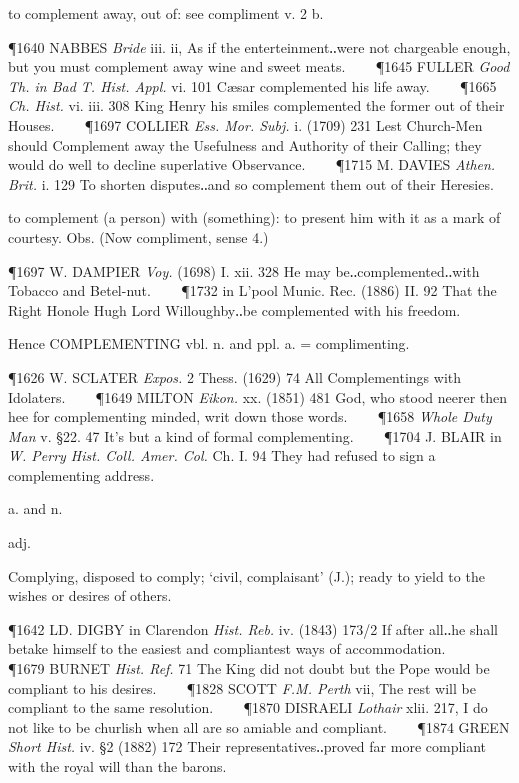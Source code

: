 \begin{description}[wide, labelwidth=!, labelindent=0pt]
\begin{myenumerate}
 to complement away, out of: see compliment v. 2 b.

\P 1640 NABBES  \textit{Bride} iii. ii, As if the enterteinment‥were not chargeable enough, but you must complement away wine and sweet meats.    
\P 1645 FULLER  \textit{Good Th. in Bad T. Hist. Appl.} vi. 101 Cæsar complemented his life away.    
\P 1665 \textit{Ch. Hist.} vi. iii. 308 King Henry his smiles complemented the former out of their Houses.    
\P 1697 COLLIER  \textit{Ess. Mor. Subj.} i. (1709) 231 Lest Church-Men should Complement away the Usefulness and Authority of their Calling; they would do well to decline superlative Observance.    
\P 1715 M. DAVIES  \textit{Athen. Brit.} i. 129 To shorten disputes‥and so complement them out of their Heresies.

 to complement (a person) with (something): to present him with it as a mark of courtesy. Obs. (Now compliment, sense 4.)

\P 1697 W. DAMPIER  \textit{Voy.} (1698) I. xii. 328 He may be‥complemented‥with Tobacco and Betel-nut.    
\P 1732 in L'pool Munic. Rec. (1886) II. 92 That the Right Honole Hugh Lord Willoughby‥be complemented with his freedom.

\noindent
Hence COMPLEMENTING vbl. n. and ppl. a. = complimenting.

\P 1626 W. SCLATER  \textit{Expos.} 2 Thess. (1629) 74 All Complementings with Idolaters.    
\P 1649 MILTON  \textit{Eikon.} xx. (1851) 481 God, who stood neerer then hee for complementing minded, writ down those words.    
\P 1658 \textit{Whole  Duty Man} v. §22. 47 It's but a kind of formal complementing.    
\P 1704 J. BLAIR in \textit{W. Perry Hist. Coll. Amer. Col.} Ch. I. 94 They had refused to sign a complementing address.
\end{myenumerate}


 a. and n.

\noindent {}

\vspace{-0.3cm}

\begin{myenumerate}

 adj.

 Complying, disposed to comply; ‘civil, complaisant’ (J.); ready to yield to the wishes or desires of others.

\P 1642 LD. DIGBY in Clarendon \textit{Hist. Reb.} iv. (1843) 173/2 If after all‥he shall betake himself to the easiest and compliantest ways of accommodation.    
\P 1679 BURNET  \textit{Hist. Ref.} 71 The King did not doubt but the Pope would be compliant to his desires.    
\P 1828 SCOTT  \textit{F.M. Perth} vii, The rest will be compliant to the same resolution.    
\P 1870 DISRAELI  \textit{Lothair} xlii. 217, I do not like to be churlish when all are so amiable and compliant.    
\P 1874 GREEN  \textit{Short Hist.} iv. §2 (1882) 172 Their representatives‥proved far more compliant with the royal will than the barons.


\end{myenumerate}
\end{description}

